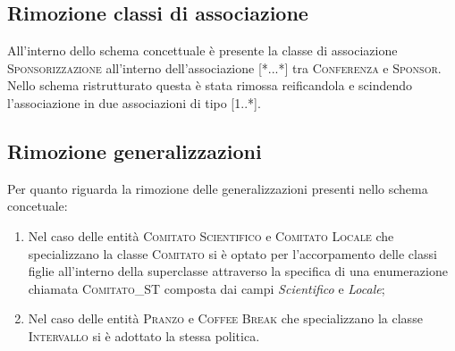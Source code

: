 \subsection{Rimozione classi di associazione}
All'interno dello schema concettuale è presente la classe di associazione \textsc{Sponsorizzazione} all'interno dell'associazione [*...*] tra \textsc{Conferenza} e \textsc{Sponsor}. Nello schema ristrutturato questa è stata rimossa reificandola e scindendo l'associazione in due associazioni di tipo [1..*].
\subsection{Rimozione generalizzazioni}
Per quanto riguarda la rimozione delle generalizzazioni presenti nello schema concetuale:
\begin{enumerate}
	\item Nel caso delle entità \textsc{Comitato Scientifico} e \textsc{Comitato Locale} che specializzano la classe \textsc{Comitato} si è optato per l'accorpamento delle classi figlie all'interno della superclasse attraverso la specifica di una enumerazione chiamata \textsc{Comitato\_ST} composta dai campi \textit{Scientifico} e \textit{Locale};
	\item Nel caso delle entità \textsc{Pranzo} e \textsc{Coffee Break} che specializzano la classe \textsc{Intervallo} si è adottato la stessa politica.
\end{enumerate}
